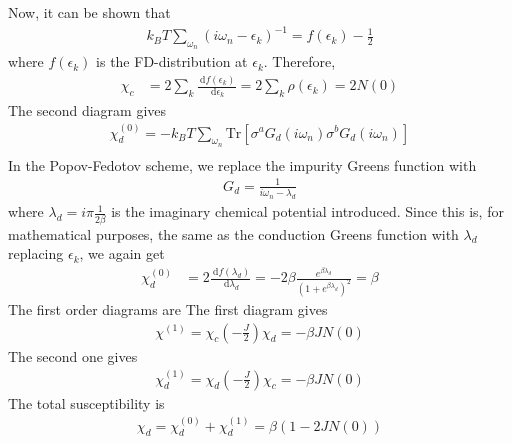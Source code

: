 \documentclass[twoside]{report}
\numberwithin{equation}{section}
\begin{document}
Now, it can be shown that
\begin{equation}\begin{aligned}
	k_B T\sum_{\omega_n} \left(i\omega_n - \epsilon_k\right)^{-1} = f(\epsilon_k) - \frac{1}{2}
\end{aligned}\end{equation}
where \(f(\epsilon_k)\) is the FD-distribution at \(\epsilon_k\).
Therefore,
\begin{equation}\begin{aligned}
	\chi_c &=2 \sum_k \frac{\:\mathrm{d}f(\epsilon_k)}{\:\mathrm{d}\epsilon_k}= 2\sum_k \rho(\epsilon_k) = 2 N(0)
\end{aligned}\end{equation}
The second diagram gives
\begin{equation}\begin{aligned}
	\chi_d^{(0)} = -k_B T \sum_{\omega_n} \text{Tr}\left[\sigma^a G_d(i\omega_n)\sigma^bG_d(i\omega_n)\right] \\
\end{aligned}\end{equation}
In the Popov-Fedotov scheme, we replace the impurity Greens function with
\begin{equation}\begin{aligned}
G_d = \frac{1}{i\omega_n - \lambda_d}
\end{aligned}\end{equation}
where \(\lambda_d = i\pi\frac{1}{2\beta}\) is the imaginary chemical potential introduced.
Since this is, for mathematical purposes, the same as the conduction Greens function with \(\lambda_d\) replacing \(\epsilon_k\), we again get
\begin{equation}\begin{aligned}
	\chi^{(0)}_d &=2 \frac{\:\mathrm{d}f(\lambda_d)}{\:\mathrm{d}\lambda_d}= -2\beta\frac{e^{\beta \lambda_d}}{\left(1+e^{\beta \lambda_d}\right)^2} = \beta
\end{aligned}\end{equation}
The first order diagrams are
The first diagram gives
\begin{equation}\begin{aligned}
	\chi^{(1)} = \chi_c \left(-\frac{J}{2}\right) \chi_d = -\beta JN(0)
\end{aligned}\end{equation}
The second one gives
\begin{equation}\begin{aligned}
	\chi_d^{(1)} = \chi_d \left(-\frac{J}{2}\right) \chi_c = -\beta JN(0)
\end{aligned}\end{equation}
The total susceptibility is
\begin{equation}\begin{aligned}
	\chi_d = \chi^{(0)}_d + \chi_d^{(1)} = \beta\left(1 - 2 J N(0)\right)
\end{aligned}\end{equation}
\end{document}
